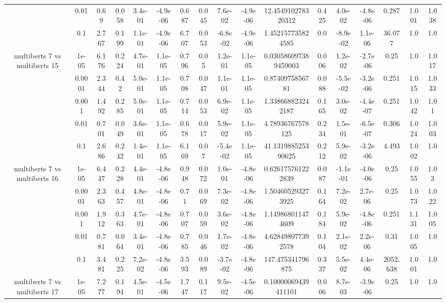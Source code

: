 \begin{tabular}{|c|c|c|c|c|c|c|c|c|c|c|c|c|c|c|c|c|}
 & 0.01 & 0.69 & 0.058 & 3.4e-01 & -4.9e-06 & 0.687 & 0.045 & 7.6e-02 & -4.9e-06 & 12.454910278320312 & 0.425 & 4.0e-02 & -4.8e-06 & 0.287 & 1.001 & 1.038 \\
 & 0.1 & 2.767 & 0.199 & 1.1e-01 & -4.9e-06 & 6.707 & 0.053 & -6.8e-02 & -4.9e-06 & 1.452157735824585 & 0.0 & -8.9e-02 & 1.1e-06 & 36.077 & 1.0 & 1.0 \\
\hline
\multirow{5}{*}{multiberts 7 vs multiberts 15} & 1e-05 & 6.176 & 0.224 & 4.7e-01 & 1.1e-05 & 0.796 & 0.05 & 1.2e-01 & 1.1e-05 & 0.030586097389459003 & 0.006 & 1.2e-02 & -2.7e-06 & 0.25 & 1.0 & 1.017 \\
 & 0.0001 & 2.344 & 0.42 & 5.0e-01 & 1.1e-05 & 0.708 & 0.047 & 1.1e-01 & 1.1e-05 & 0.8740975856781 & 0.088 & -5.5e-02 & -3.2e-06 & 0.251 & 1.015 & 1.033 \\
 & 0.001 & 1.492 & 0.285 & 5.0e-01 & 1.1e-05 & 0.714 & 0.053 & 6.9e-02 & 1.1e-05 & 1.338668823242187 & 0.165 & 3.0e-02 & -4.4e-07 & 0.251 & 1.042 & 1.01 \\
 & 0.01 & 0.701 & 0.049 & 3.6e-01 & 1.1e-05 & 0.678 & 0.017 & 5.9e-02 & 1.1e-05 & 4.78936767578125 & 0.234 & 1.5e-01 & -6.5e-07 & 0.306 & 1.024 & 1.003 \\
 & 0.1 & 2.686 & 0.242 & 1.4e-01 & 1.1e-05 & 6.169 & 0.07 & -5.4e-02 & 1.1e-05 & 41.131988525390625 & 0.212 & 5.9e-02 & -3.2e-06 & 4.493 & 1.002 & 1.0 \\
\hline
\multirow{5}{*}{multiberts 7 vs multiberts 16} & 1e-05 & 6.447 & 0.228 & 4.4e-01 & -4.8e-06 & 0.948 & 0.072 & 1.0e-01 & -4.8e-06 & 0.626175761222839 & 0.087 & -1.1e-01 & -4.0e-06 & 0.25 & 1.055 & 1.03 \\
 & 0.0001 & 2.363 & 0.457 & 4.8e-01 & -4.8e-06 & 0.71 & 0.069 & 7.3e-02 & -4.8e-06 & 1.504605293273925 & 0.164 & 7.2e-02 & 2.7e-06 & 0.25 & 1.073 & 1.022 \\
 & 0.001 & 1.912 & 0.363 & 4.7e-01 & -4.8e-06 & 0.707 & 0.059 & 3.6e-02 & -4.8e-06 & 1.149868011474609 & 0.184 & 5.9e-02 & -4.8e-06 & 0.251 & 1.131 & 1.005 \\
 & 0.01 & 0.781 & 0.064 & 3.4e-01 & -4.8e-06 & 0.785 & 0.046 & 1.7e-02 & -4.8e-06 & 4.628498077392578 & 0.104 & 2.1e-02 & 2.2e-06 & 0.31 & 1.005 & 1.0 \\
 & 0.1 & 3.481 & 0.225 & 7.2e-02 & -4.8e-06 & 3.593 & 0.089 & -3.7e-02 & -4.8e-06 & 147.475341796875 & 0.337 & 5.5e-02 & 4.4e-06 & 2052.638 & 1.001 & 1.0 \\
\hline
\multirow{5}{*}{multiberts 7 vs multiberts 17} & 1e-05 & 7.277 & 0.194 & 4.5e-01 & -4.5e-06 & 1.747 & 0.117 & 9.5e-02 & -4.5e-06 & 0.10000069439411101 & 0.006 & 8.7e-03 & -3.9e-06 & 0.25 & 1.0 & 1.0 \\

\end{tabular}
